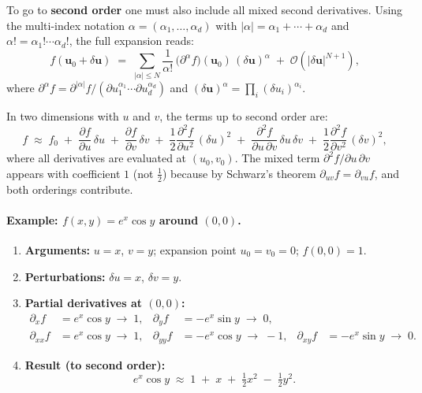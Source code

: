 \documentclass{article}
\begin{document}
	To go to \textbf{second order} one must also include all mixed second
	derivatives.  Using the multi-index notation
	$\alpha = (\alpha_1,\ldots,\alpha_d)$ with
	$|\alpha|=\alpha_1+\cdots+\alpha_d$ and
	$\alpha! = \alpha_1!\cdots\alpha_d!$, the full expansion reads:
	\begin{equation}
		f(\boldsymbol{u}_0 + \delta\boldsymbol{u})
		\;=\; \sum_{|\alpha|\leq N}
		\frac{1}{\alpha!}\,\bigl(\partial^{\alpha}f\bigr)(\boldsymbol{u}_0)
		\,(\delta\boldsymbol{u})^{\alpha}
		\;+\; \mathcal{O}\!\left(|\delta\boldsymbol{u}|^{N+1}\right),
		\label{eq:taylor_multiindex}
	\end{equation}
	where $\partial^{\alpha}f = \partial^{|\alpha|}f /
	(\partial u_1^{\alpha_1}\cdots\partial u_d^{\alpha_d})$ and
	$(\delta\boldsymbol{u})^{\alpha}=\prod_i(\delta u_i)^{\alpha_i}$.
	
	In two dimensions with $u$ and $v$, the terms up to second order are:
	\begin{equation}
		f \;\approx\; f_0
		\;+\; \frac{\partial f}{\partial u}\,\delta u
		\;+\; \frac{\partial f}{\partial v}\,\delta v
		\;+\; \frac{1}{2}\frac{\partial^2 f}{\partial u^2}\,(\delta u)^2
		\;+\; \frac{\partial^2 f}{\partial u\,\partial v}\,\delta u\,\delta v
		\;+\; \frac{1}{2}\frac{\partial^2 f}{\partial v^2}\,(\delta v)^2,
		\label{eq:taylor2d}
	\end{equation}
	where all derivatives are evaluated at $(u_0,v_0)$.  The mixed term
	$\partial^2 f/\partial u\,\partial v$ appears with coefficient $1$ (not
	$\tfrac{1}{2}$) because by Schwarz's theorem
	$\partial_{uv}f = \partial_{vu}f$, and both orderings contribute.
	
	\paragraph{Example: $f(x,y)=e^x\cos y$ around $(0,0)$.}
	
	\begin{enumerate}
		\item \textbf{Arguments:} $u=x$, $v=y$; expansion point $u_0=v_0=0$;
		$f(0,0)=1$.
		\item \textbf{Perturbations:} $\delta u = x$, $\delta v = y$.
		\item \textbf{Partial derivatives at $(0,0)$:}
		\begin{align*}
			\partial_x f &= e^x\cos y \;\to\; 1, &
			\partial_y f &= -e^x\sin y \;\to\; 0,\\
			\partial_{xx}f &= e^x\cos y \;\to\; 1, &
			\partial_{yy}f &= -e^x\cos y \;\to\; -1, &
			\partial_{xy}f &= -e^x\sin y \;\to\; 0.
		\end{align*}
		\item \textbf{Result (to second order):}
		\begin{equation}
			e^x\cos y \;\approx\; 1 \;+\; x \;+\; \tfrac{1}{2}x^2
			\;-\; \tfrac{1}{2}y^2.
		\end{equation}
	\end{enumerate}
	
\end{document}
